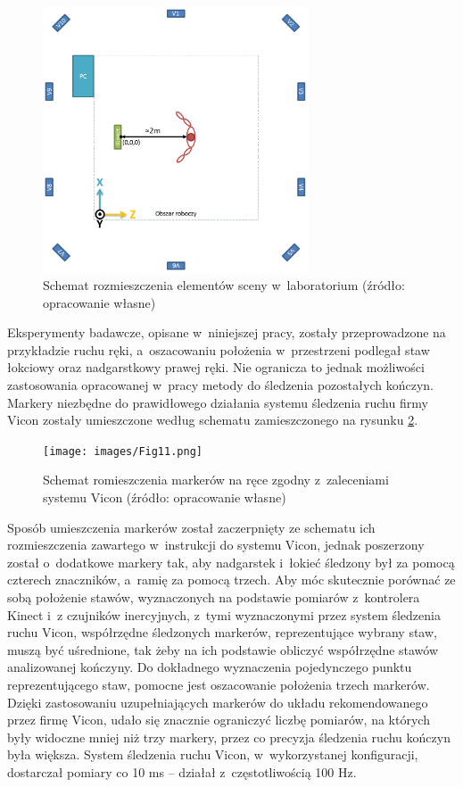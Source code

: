 	\begin{figure}[!htb]
		\centering
		\includegraphics[width=0.7\textwidth]{images/scene.png}
		\caption{Schemat rozmieszczenia elementów sceny w~laboratorium  (źródło: opracowanie własne)}
		\label{fig:experiments:scene}
	\end{figure}
		  
		 
Eksperymenty badawcze, opisane w~niniejszej pracy, zostały przeprowadzone na przykładzie ruchu ręki, a~oszacowaniu położenia w~przestrzeni podlegał staw łokciowy oraz nadgarstkowy prawej ręki. Nie ogranicza to jednak możliwości zastosowania opracowanej w~pracy metody do śledzenia pozostałych kończyn. Markery niezbędne do prawidłowego działania systemu śledzenia ruchu firmy Vicon zostały umieszczone według schematu zamieszczonego na rysunku \ref{fig:experiments:viconArm}.
		
	\begin{figure}[!htb]
		\centering
		\texttt{[image: images/Fig11.png]}
		\caption{Schemat romieszczenia markerów na ręce zgodny z~zaleceniami systemu Vicon  (źródło: opracowanie własne)}
		\label{fig:experiments:viconArm}
	\end{figure}
				
Sposób umieszczenia markerów został zaczerpnięty ze schematu ich rozmieszczenia zawartego w~instrukcji do systemu Vicon, jednak poszerzony został o~dodatkowe markery tak, aby nadgarstek i~łokieć śledzony był za pomocą czterech znaczników, a~ramię za pomocą trzech. Aby móc skutecznie porównać ze sobą położenie stawów, wyznaczonych na podstawie pomiarów z~kontrolera Kinect i~z czujników inercyjnych, z~tymi wyznaczonymi przez system śledzenia ruchu Vicon, współrzędne śledzonych markerów, reprezentujące wybrany staw, muszą być uśrednione, tak żeby na ich podstawie obliczyć współrzędne stawów analizowanej kończyny. Do dokładnego wyznaczenia pojedynczego punktu reprezentującego staw, pomocne jest oszacowanie położenia trzech markerów. Dzięki zastosowaniu uzupełniających markerów do układu rekomendowanego przez firmę Vicon, udało się znacznie ograniczyć liczbę pomiarów, na których były widoczne mniej niż trzy markery, przez co precyzja śledzenia ruchu kończyn była większa. System śledzenia ruchu Vicon, w~wykorzystanej konfiguracji, dostarczał pomiary co 10 ms -- działał z~częstotliwością 100 Hz.  
				
